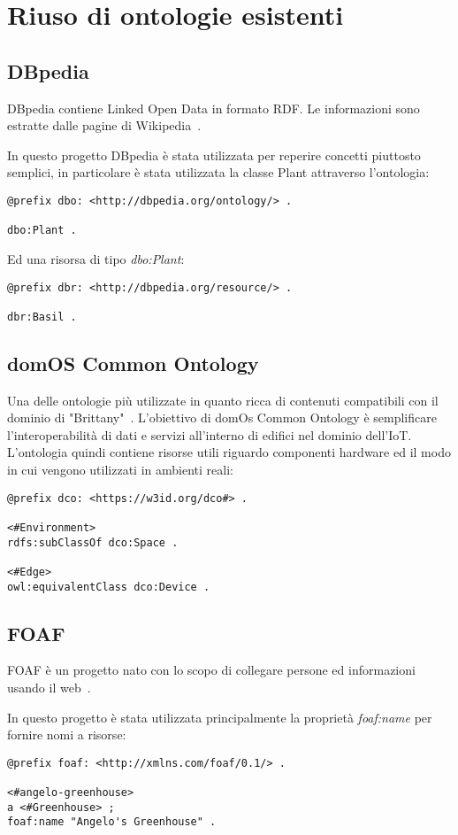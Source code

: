 \section{Riuso di ontologie esistenti}
\subsection{DBpedia}
DBpedia contiene Linked Open Data in formato RDF. Le informazioni sono estratte dalle pagine di Wikipedia~\cite{wwwdbped0:online}.

\noindent In questo progetto DBpedia è stata utilizzata per reperire concetti piuttosto semplici, in particolare è stata utilizzata la classe Plant attraverso l'ontologia:
\begin{verbatim}
@prefix dbo: <http://dbpedia.org/ontology/> .

dbo:Plant .
\end{verbatim}
Ed una risorsa di tipo \textit{dbo:Plant}:
\begin{verbatim}
@prefix dbr: <http://dbpedia.org/resource/> .

dbr:Basil .
\end{verbatim}

\subsection{domOS Common Ontology}
Una delle ontologie più utilizzate in quanto ricca di contenuti compatibili con il dominio di "Brittany"~\cite{domOSCom57:online}.
L'obiettivo di domOs Common Ontology è semplificare l'interoperabilità di dati e servizi all'interno di edifici nel dominio dell'IoT. L'ontologia quindi contiene risorse utili riguardo componenti hardware ed il modo in cui vengono utilizzati in ambienti reali:

\begin{verbatim}
@prefix dco: <https://w3id.org/dco#> .

<#Environment>
rdfs:subClassOf dco:Space .

<#Edge>
owl:equivalentClass dco:Device .
\end{verbatim}

\subsection{FOAF}
FOAF è un progetto nato con lo scopo di collegare persone ed informazioni usando il web~\cite{FOAFVoca16:online}.

\noindent In questo progetto è stata utilizzata principalmente la proprietà \textit{foaf:name} per fornire nomi a risorse:
\begin{verbatim}
@prefix foaf: <http://xmlns.com/foaf/0.1/> .

<#angelo-greenhouse>
a <#Greenhouse> ;
foaf:name "Angelo's Greenhouse" .
\end{verbatim}

